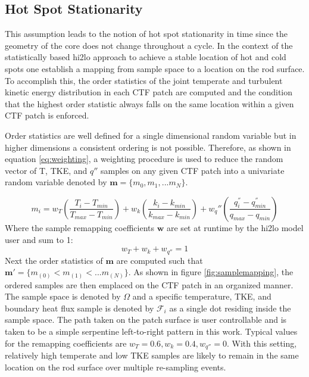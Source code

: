 \subsection{Hot Spot Stationarity}

This assumption leads to the notion of hot spot stationarity in time since the geometry of the core does not change throughout a cycle.  In the context of the statistically based hi2lo approach to achieve a stable location of hot and cold spots one establish a mapping from sample space to a location on the rod surface.  To accomplish this, the order statistics of the joint temperate and turbulent kinetic energy distribution in each CTF patch are computed and the condition that the highest order statistic always falls on the same location within a given CTF patch is enforced.

Order statistics are well defined for a single dimensional random variable but in higher dimensions a consistent ordering is not possible.  Therefore, as shown in equation \ref{eq:weighting}, a weighting procedure is used to reduce the random vector of T, TKE, and $q''$ samples on any given CTF patch into a univariate random variable denoted by $\mathbf{m}=\{m_0, m_1, ... m_N\}$.

\begin{equation}
    m_i = w_T \left( \frac{T_i - T_{min}}{T_{max} - T_{min}} \right) + w_k \left( \frac{k_i - k_{min}}{k_{max} - k_{min}} \right) +  w_q'' \left( \frac{q^{''}_i - q^{''}_{min}}{q_{max} - q_{min}} \right)
\label{eq:weighting}
\end{equation}
Where the sample remapping coefficients $\mathbf w$ are set at runtime by the hi2lo model user and sum to 1:
\begin{equation}
w_T + w_k + w_{q''} = 1
\end{equation}
Next the order statistics of $\mathbf m$ are computed such that $\mathbf m' = \{ m_{(0)} < m_{(1)}< ... m_{(N)} \}$.  As shown in figure \ref{fig:samplemapping}, the ordered samples are then emplaced on the CTF patch in an organized manner.  The sample space is denoted by $\Omega$ and a specific temperature, TKE, and boundary heat flux sample is denoted by $\mathcal F_i$ as a single dot residing inside the sample space.  The path taken on the patch surface is user controllable and is taken to be a simple serpentine left-to-right pattern in this work.
Typical values for the remapping coefficients are $w_T=0.6, w_k=0.4, w_{q''}=0$.  With this setting, relatively high temperate and low TKE samples are likely to remain in the same location on the rod surface over multiple re-sampling events.

